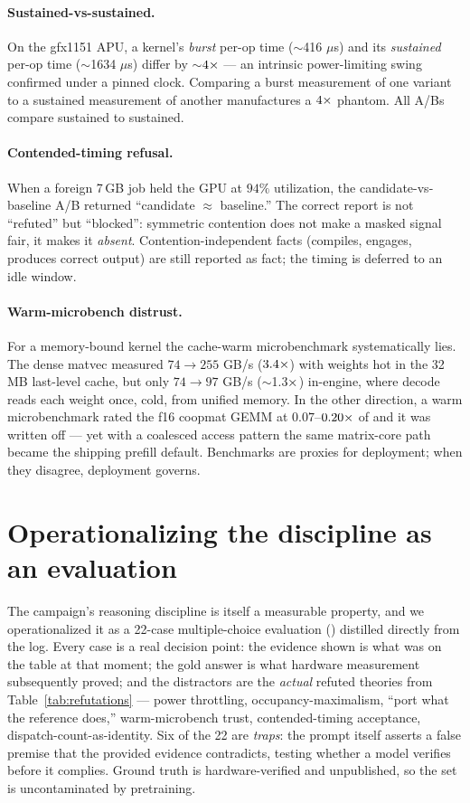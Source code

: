\documentclass[11pt]{article}
\begin{document}
\paragraph{Sustained-vs-sustained.} On the gfx1151 APU, a kernel's \emph{burst} per-op time ($\sim$416 $\mu$s)
and its \emph{sustained} per-op time ($\sim$1634 $\mu$s) differ by $\sim$$4\times$ --- an intrinsic power-limiting
swing confirmed under a pinned clock. Comparing a burst measurement of one variant to a sustained
measurement of another manufactures a $4\times$ phantom. All A/Bs compare sustained to sustained.

\paragraph{Contended-timing refusal.} When a foreign 7\,GB job held the GPU at $94\%$ utilization, the
candidate-vs-baseline A/B returned ``candidate $\approx$ baseline.'' The correct report is not ``refuted''
but ``blocked'': symmetric contention does not make a masked signal fair, it makes it \emph{absent}.
Contention-independent facts (compiles, engages, produces correct output) are still reported as fact; the
timing is deferred to an idle window.

\paragraph{Warm-microbench distrust.} For a memory-bound kernel the cache-warm microbenchmark systematically
lies. The dense  matvec measured $74\to255$ GB/s ($3.4\times$) with weights hot in the 32 MB
last-level cache, but only $74\to97$ GB/s ($\sim$1.3$\times$) in-engine, where decode reads each weight once,
cold, from unified memory. In the other direction, a warm microbenchmark rated the f16 coopmat GEMM at
$0.07$--$0.20\times$ of  and it was written off --- yet with a coalesced access pattern the same
matrix-core path became the shipping prefill default. Benchmarks are proxies for deployment; when they
disagree, deployment governs.

\section{Operationalizing the discipline as an evaluation}
\label{sec:eval}

The campaign's reasoning discipline is itself a measurable property, and we operationalized it as a
22-case multiple-choice evaluation () distilled directly from the log. Every case is a real
decision point: the evidence shown is what was on the table at that moment; the gold answer is what
hardware measurement subsequently proved; and the distractors are the \emph{actual} refuted theories from
Table~\ref{tab:refutations} --- power throttling, occupancy-maximalism, ``port what the reference does,''
warm-microbench trust, contended-timing acceptance, dispatch-count-as-identity. Six of the 22 are
\emph{traps}: the prompt itself asserts a false premise that the provided evidence contradicts, testing
whether a model verifies before it complies. Ground truth is hardware-verified and unpublished, so the set
is uncontaminated by pretraining.
\end{document}
